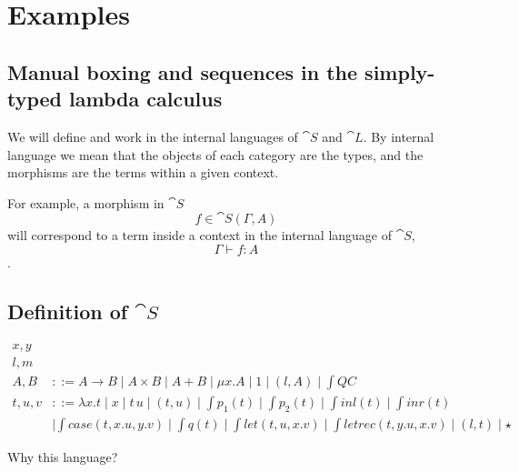 \section{Examples}\label{sec:examples}

\subsection{Manual boxing and sequences in the simply-typed lambda calculus}

We will define and work in the internal languages of $\cat S$ and $\cat L$. By
internal language we mean that the objects of each category are the types, and
the morphisms are the terms within a given context.

For example, a morphism in $\cat S$ $$ f \in \cat S (\Gamma, A) $$ will
correspond to a term inside a context in the internal language of $\cat S$, $$
  \Gamma \vdash f : A $$.

\subsection{Definition of $\cat S$}

\begin{align*}
  x,y  \tag{variables}                                                                                                                               \\
  l,m  \tag{labels}                                                                                                                                  \\
  A, B    & ::=  A \to B \mid A \times B \mid A + B \mid \mu x . A \mid 1 \mid (l, A) \mid \int{Q} C \tag{types}                                     \\
  t, u, v & ::= \lambda x . t \mid x \mid t\,u \mid (t, u) \mid \int{p}_1(t) \mid \int{p}_2(t) \mid \int{inl}(t) \mid \int{inr}(t)                   \\
          & \mid \int{case}(t, x.u, y.v) \mid \int{q}(t) \mid \int{let}(t, u, x.v) \mid \int{letrec}(t, y.u, x.v) \mid (l, t) \mid \star \tag{terms}
\end{align*}

Why this language?

